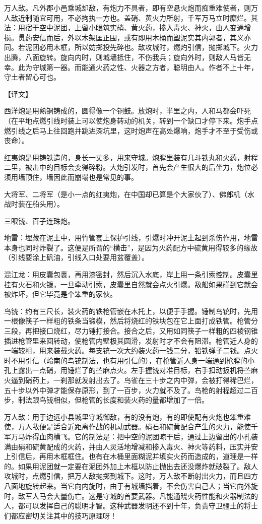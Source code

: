 \documentclass[12pt,UTF8]{ctexbook}
\begin{document}
万人敌。凡外郡小邑乘城却敌，有炮力不具者，即有空悬火炮而痴重难使者，则万人敌近制随宜可用，不必拘执一方也。盖硝、黄火力所射，千军万马立时糜烂。其法：用宿干空中泥团，上留小眼筑实硝、黄火药，掺入毒火、神火，由人变通增损。贯药安信而后，外以木架匡正围，或有即用木桶而塑泥实其内郭者，其义亦同。若泥团必用木框，所以妨掷投先碎也。敌攻城时，燃灼引信，抛掷城下。火力出腾，八面旋转。旋向内时，则城墙抵住，不伤我兵；旋向外时，则敌人马皆无幸。此为守城第一器。而能通火药之性、火器之方者，聪明由人。作者不上十年，守土者留心可也。

【译文】

西洋炮是用熟铜铸成的，圆得像一个铜鼓。放炮时，半里之内，人和马都会吓死（在平地点燃引线时装上可以使炮身转动的机关，转到一个缺口才停下来。炮手点燃引线之后马上往回跑并跳进深坑里，这时炮声在高处爆响，炮手才不至于受伤或丧命）。

红夷炮是用铸铁造的，身长一丈多，用来守城。炮膛里装有几斗铁丸和火药，射程二里，被击中的目标会变得碎粉。大炮引发时，首先会产生很大的后坐力，炮位必须用墙顶住，墙因此而崩塌也是常见的事。

大将军、二将军（是小一点的红夷炮，在中国却已算是个大家伙了）、佛郎机（水战时装在船头用）。

三眼铳、百子连珠炮。

地雷：埋藏在泥土中，用竹管套上保护引线，引爆时冲开泥土起到杀伤作用，地雷本身也同时炸裂了。这便是所谓的“横击”，是因为火药配方中硫黄用得较多的缘故（引线要涂上矾油，引线入口处要用盆覆盖）。

混江龙：用皮囊包裹，再用漆密封，然后沉入水底，岸上用一条引索控制。皮囊里挂有火石和火镰，一旦牵动引索，皮囊里自然就会点火引爆。敌船如果碰到它就会被炸坏，但它毕竟是个笨重的家伙。

鸟铳：约有三尺长，装火药的铁枪管嵌在木托上，以便于手握。锤制鸟铳时，先用一根像筷子一样粗的铁条当锻模，然后将烧红的铁块包在它上面打成铁管。枪管分三段，再把接口烧红，尽力锤打接合。接合之后，又用如同筷子一样粗的四棱钢锥插进枪管里来回转动，使枪管内壁极其圆滑，发射时才不会有阻滞。枪管近人身的一端较粗，用来装载火药。每支铳一次大约装火药一钱二分，铅铁弹子二钱。点火时不用引信（岭南的鸟铳制法，也有用引信的），在枪管近人身一端通到枪膛的小孔上露出一点硝，用锤烂了的苎麻点火。左手握铳对准目标，右手扣动扳机将苎麻火逼到硝药上，一刹那就发射出去了。鸟雀在三十步之内中弹，会被打得稀巴烂，五十步以外中弹才能保存原形，到了一百步，火力就不及了。鸟枪的射程超过二百步，制法跟鸟铳相似，但枪管的长度和装火药的量都增加了一倍。

万人敌：用于边远小县城里守城御敌，有的没有炮，有的即使配有火炮也笨重难使，万人敌便是适合近距离作战的机动武器。硝石和硫黄配合产生的火力，能使千军万马炸得血肉横飞。它的制法是：把中空的泥团晾干后，通过上边留出的小孔装满由硝和硫黄配成的火药，并由人灵活地增减和掺入毒火、神火等药料，压实并安上引信后，再用木框框住。也有在木桶里面糊泥并填实火药而造成的，道理是一样的。如果用泥团就一定要在泥团外加上木框以防止抛出去还没爆炸就破裂了。敌人攻城时，点燃引信，把万人敌抛掷到城下。这时，万人敌不断射出火力，而且四方八面地旋转起来。当它向内旋时，由于有城墙挡着，不会伤害自己人；当它向外旋时，敌军人马会大量伤亡。这是守城的首要武器。凡能通晓火药性能和火器制法的人，都可以发挥自己的聪明才智。这种武器发明还不到十年，负责守卫疆土的将士们都应密切关注其中的技巧原理呀！
\end{document}
